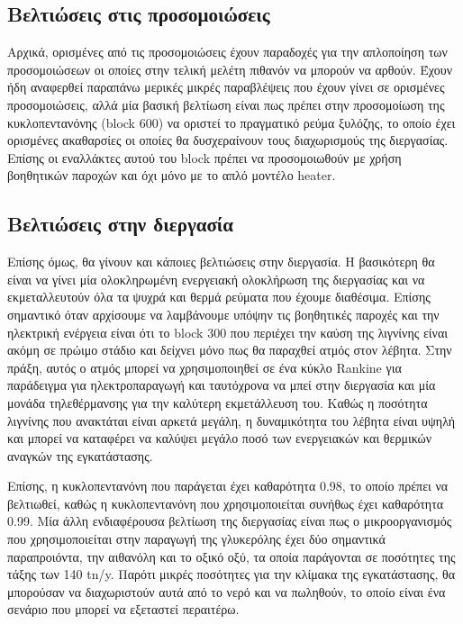 \documentclass[11pt]{article}
\begin{document}
\subsection{Βελτιώσεις στις προσομοιώσεις}
\label{sec:org9d33ee1}
Αρχικά, ορισμένες από τις προσομοιώσεις έχουν παραδοχές για την απλοποίηση των προσομοιώσεων οι οποίες στην τελική μελέτη πιθανόν να μπορούν να αρθούν. Έχουν ήδη αναφερθεί παραπάνω μερικές μικρές παραβλέψεις που έχουν γίνει σε ορισμένες προσομοιώσεις, αλλά μία βασική βελτίωση είναι πως πρέπει στην προσομοίωση της κυκλοπεντανόνης (block 600) να οριστεί το πραγματικό ρεύμα ξυλόζης, το οποίο έχει ορισμένες ακαθαρσίες οι οποίες θα δυσχεραίνουν τους διαχωρισμούς της διεργασίας. Επίσης οι εναλλάκτες αυτού του block πρέπει να προσομοιωθούν με χρήση βοηθητικών παροχών και όχι μόνο με το απλό μοντέλο heater.

\subsection{Βελτιώσεις στην διεργασία}
\label{sec:org1440de5}
Επίσης όμως, θα γίνουν και κάποιες βελτιώσεις στην διεργασία. Η βασικότερη θα είναι να γίνει μία ολοκληρωμένη ενεργειακή ολοκλήρωση της διεργασίας και να εκμεταλλευτούν όλα τα ψυχρά και θερμά ρεύματα που έχουμε διαθέσιμα. Επίσης σημαντικό όταν αρχίσουμε να λαμβάνουμε υπόψην τις βοηθητικές παροχές και την ηλεκτρική ενέργεια είναι ότι το block 300 που περιέχει την καύση της λιγνίνης είναι ακόμη σε πρώιμο στάδιο και δείχνει μόνο πως θα παραχθεί ατμός στον λέβητα. Στην πράξη, αυτός ο ατμός μπορεί να χρησιμοποιηθεί σε ένα κύκλο Rankine για παράδειγμα για ηλεκτροπαραγωγή και ταυτόχρονα να μπεί στην διεργασία και μία μονάδα τηλεθέρμανσης για την καλύτερη εκμετάλλευση του. Καθώς η ποσότητα λιγνίνης που ανακτάται είναι αρκετά μεγάλη, η δυναμικότητα του λέβητα είναι υψηλή και μπορεί να καταφέρει να καλύψει μεγάλο ποσό των ενεργειακών και θερμικών αναγκών της εγκατάστασης.

Επίσης, η κυκλοπεντανόνη που παράγεται έχει καθαρότητα 0.98, το οποίο πρέπει να βελτιωθεί, καθώς η κυκλοπεντανόνη που χρησιμοποιείται συνήθως έχει καθαρότητα 0.99. Μία άλλη ενδιαφέρουσα βελτίωση της διεργασίας είναι πως ο μικροοργανισμός που χρησιμοποιείται στην παραγωγή της γλυκερόλης έχει δύο σημαντικά παραπροιόντα, την αιθανόλη και το οξικό οξύ, τα οποία παράγονται σε ποσότητες της τάξης των 140 tn/y. Παρότι μικρές ποσότητες για την κλίμακα της εγκατάστασης, θα μπορούσαν να διαχωριστούν αυτά από το νερό και να πωληθούν, το οποίο είναι ένα σενάριο που μπορεί να εξεταστεί περαιτέρω.
\end{document}

